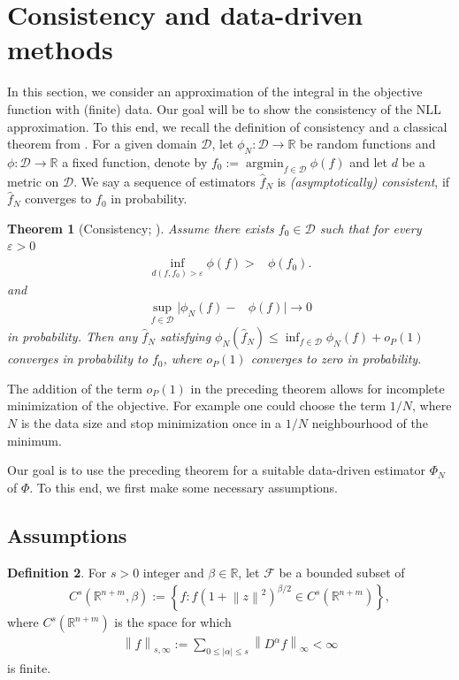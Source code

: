 \documentclass{amsart}
\newtheorem{theorem}{Theorem}[section]
\theoremstyle{definition}
\newtheorem{definition}[theorem]{Definition}
\newcommand{\R}{{\mathbb R}}
\newcommand{\norm}[1]{\left\|#1\right\|}
\newcommand{\F}{\mathcal{F}}
\newcommand{\argmin}{\operatorname*{argmin}}
\newcommand{\D}{\mathcal{D}}
\begin{document}
\section{Consistency and data-driven methods}\label{sec: data driven}
In this section, we consider an approximation of the integral in the objective function with (finite) data. Our goal will be to show the consistency of the NLL approximation.
To this end, we recall the definition of consistency and a classical theorem from \cite{Vaart_1998}. 
For a given domain $\D$, let $\phi_N: \D \rightarrow \R$ be random functions and $\phi: \D \rightarrow \R$ a fixed function, denote by $f_0 := \argmin_{f \in \D} \phi(f)$ and let $d$ be a metric on $\D$. We say a sequence of estimators $\hat{f}_N$ is \emph{(asymptotically) consistent}, if $\hat f_N$ converges to $f_0$ in probability.
\begin{theorem}[Consistency; \cite{Vaart_1998}]\label{thm: consistency, Vaart}
    Assume there exists $f_0 \in \D$ such that for every $\varepsilon > 0$
    \begin{align}
        \inf_{d(f, f_0) > \varepsilon}  \phi (f) >& \phi(f_0). \label{eq: uniqueness condition}
    \end{align}
    and 
    \begin{align}
                \sup_{f \in \D}  \big| \phi_N(f) -& \phi(f) \big|  \rightarrow 0 \label{eq: glivenko cantelli condition} 
    \end{align}
    in probability.
    Then any $\hat f_N$ satisfying $\phi_N(\hat f_N) \le \inf_{f\in \D} \phi_N(f) + o_P(1)$ converges in probability to $f_0$, where $o_P(1)$ converges to zero in probability.
\end{theorem}
The addition of the term $o_P(1)$ in the preceding theorem allows for incomplete minimization of the objective. For example one could choose the term $1/N$, where $N$ is the data size and stop minimization once in a $1/N$ neighbourhood of the minimum.

Our goal is to use the preceding theorem for a suitable data-driven estimator $\Phi_N$ of $\Phi$. To this end, we first make some necessary assumptions.

\subsection{Assumptions}
\begin{definition}
     For $s >0$ integer and $\beta \in \R$, let $\F$ be a bounded subset of 
    \begin{eqnarray*}
        C^s(\R^{n + m}, \beta) := \left\{ f: f (1+ \norm{z}^2)^{\beta/2} \in C^s(\R^{n+m}) \right\},
    \end{eqnarray*}
    where $C^s(\R^{n+m}) $ is the space for which
    \begin{eqnarray*}
        \norm{f}_{s, \infty} := \sum\limits_{0 \le |\alpha| \le s} \norm{D^\alpha f}_\infty < \infty
    \end{eqnarray*}
    is finite. 
\end{definition}
\end{document}
